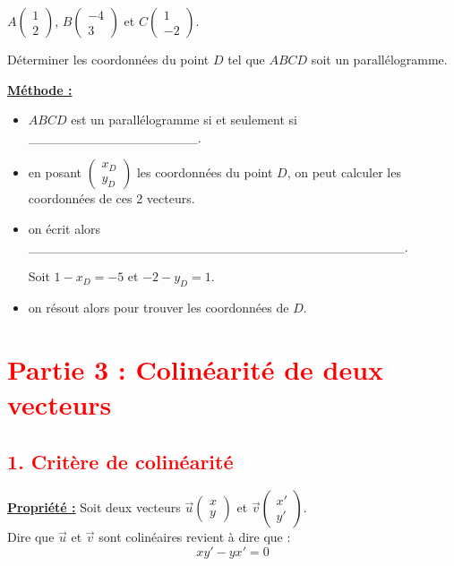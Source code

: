 \documentclass[12pt]{article}
\newcommand*{\Coord}[2]{%
  \ensuremath{
    \begin{pmatrix} 
      #1\\ 
      #2 
    \end{pmatrix}}}
\begin{document}
\begin{mdframed}[
    linewidth=1pt,
    roundcorner=5pt,
    linecolor=RoyalBlue,
    innertopmargin=10pt,
    innerbottommargin=10pt
]
$A\Coord{1}{2}$, $B\Coord{-4}{3}$ et $C\Coord{1}{-2}$.

\vspace{10pt}

Déterminer les coordonnées du point $D$ tel que $ABCD$ soit un 
parallélogramme.
\vspace{5pt}

\begin{mdframed}[
    linewidth=1pt,
    roundcorner=5pt,
    linecolor=black,
    innertopmargin=10pt,
    innerbottommargin=10pt,
    backgroundcolor=gray!15
]
\underline{\textbf{Méthode :}}
\begin{itemize}
    \item $ABCD$ est un parallélogramme si et seulement si 
    \_\_\_\_\_\_\_\_\_\_\_\_\_\_\_\_\_\_.
    \vspace{5pt}
    \item en posant $\Coord{x_D}{y_D}$ les coordonnées du point $D$, on peut calculer 
    les coordonnées de ces 2 vecteurs.
    \vspace{5pt}
    \item on écrit alors \_\_\_\_\_\_\_\_\_\_\_\_\_\_\_\_\_\_\_\_\_\_\_\_\_\_\_\_\_\_\_\_\_\_\_\_\_\_\_\_.
    
    \vspace{5pt}
    Soit $1 - x_D = -5$ et $-2 -y_D = 1$.
    \vspace{5pt}
    \item on résout alors pour trouver les coordonnées de $D$.
\end{itemize}
\end{mdframed}

\end{mdframed}

\vspace{20pt}


\section*{\textcolor{red}{Partie 3 : Colinéarité de deux vecteurs}}

\subsection*{\textcolor{red}{1. Critère de colinéarité}}

\begin{mdframed}[
    linewidth=1pt,
    roundcorner=5pt,
    linecolor=Red,
    innertopmargin=5pt,
    innerbottommargin=10pt
]
{\color{Red}\textbf{\underline{Propriété :}}}
Soit deux vecteurs $\overrightarrow{u}\Coord{x}{y}$ et $\overrightarrow{v}\Coord{x'}{y'}$.
\\Dire que $\overrightarrow{u}$ et $\overrightarrow{v}$ sont colinéaires revient à dire 
que :
\[
xy'-yx' = 0
\]
\end{mdframed}
\end{document}
